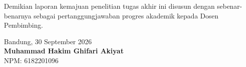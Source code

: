 \documentclass[11pt,a4paper]{article}
\begin{document}
\vspace{0.4cm}
\noindent
Demikian laporan kemajuan penelitian tugas akhir ini disusun dengan sebenar-benarnya sebagai pertanggungjawaban progres akademik kepada Dosen Pembimbing.

\vspace{0.6cm}
\begin{flushright}
    Bandung, 30 September 2026\\[1.2cm]
    \textbf{Muhammad Hakim Ghifari Akiyat}\\
    NPM: 6182201096
\end{flushright}
\end{document}
